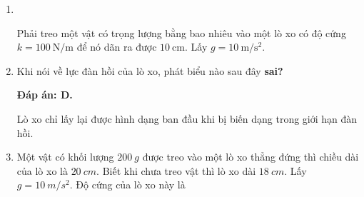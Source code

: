 \begin{enumerate}[label=\bfseries Câu \arabic*:, leftmargin=1.5cm]
\item {}\\
{Phải treo một vật có trọng lượng bằng bao nhiêu vào một lò xo có độ cứng $k =\SI{100}{\newton/\meter}$ để nó dãn ra được $\SI{10}{\centi\meter}$. Lấy $g =\SI{10}{\meter/\second^2}$.
}

	
	\item {}
	
	
	{
		Khi nói về lực đàn hồi của lò xo, phát biểu nào sau đây \textbf{sai?}
	}
	
	\hideall
	{	
		\textbf{Đáp án: D.}
		
		Lò xo chỉ lấy lại được hình dạng ban đầu khi bị biến dạng trong giới hạn đàn hồi.
	}
	\item {}
	
	
	{
		Một vật có khối lượng $\SI{200}{g}$ được treo vào một lò xo thẳng đứng thì chiều dài của lò xo là $\SI{20}{cm}$. Biết khi chưa treo vật thì lò xo dài $\SI{18}{cm}$. Lấy $g=\SI{10}{m/s^2}$. Độ cứng của lò xo này là
	}
	

\end{enumerate}
